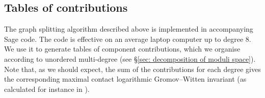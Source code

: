 \documentclass[11pt]{amsart}
\theoremstyle{definition}
\theoremstyle{definition}
\begin{document}
\subsection{Tables of contributions}\label{sec: tables} The graph splitting algorithm described above is implemented in accompanying Sage code. The code is effective on an average laptop computer up to degree $8$. We use it to generate tables of component contributions, which we organise according to unordered multi-degree (see \S \ref{sec: decomposition of moduli space}). Note that, as we should expect, the sum of the contributions for each degree gives the corresponding maximal contact logarithmic Gromov--Witten invariant (as calculated for instance in \cite[Example 2.2]{GathmannMirror}).

\end{document}
